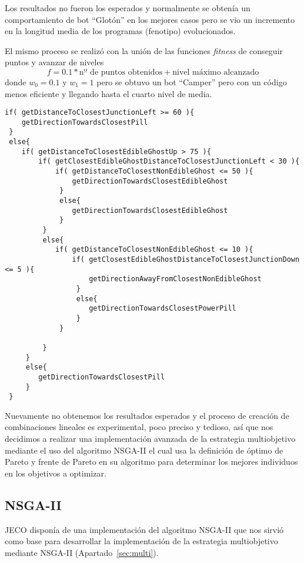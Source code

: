 Los resultados no fueron los esperados y normalmente se obtenía un comportamiento de bot ``Glotón'' en los mejores casos pero se vio un incremento en la longitud media de los programas (fenotipo) evolucionados.

El mismo proceso se realizó con la unión de las funciones \textit{fitness} de conseguir puntos y avanzar de niveles
\begin{equation}
f = 0.1 * \textrm{nº de puntos obtenidos} + \textrm{nivel máximo alcanzado}
\end{equation}
donde $w_0 = 0.1$ y $w_1 = 1$ pero se obtuvo un bot ``Camper'' pero con un código menos eficiente y llegando hasta el cuarto nivel de media.

\begin{lstlisting}[frame=single, breaklines=no, basicstyle=\fontsize{10}{11}\ttfamily, caption=Código del bot Camper obtenido mediante funciones agregativas.]
if( getDistanceToClosestJunctionLeft >= 60 ){ 
    getDirectionTowardsClosestPill
 }
 else{ 
    if( getDistanceToClosestEdibleGhostUp > 75 ){ 
        if( getClosestEdibleGhostDistanceToClosestJunctionLeft < 30 ){ 
            if( getDistanceToClosestNonEdibleGhost <= 50 ){ 
                getDirectionTowardsClosestEdibleGhost
             }
             else{ 
                getDirectionTowardsClosestEdibleGhost
             }
         }
         else{ 
            if( getDistanceToClosestNonEdibleGhost <= 10 ){ 
                if( getClosestEdibleGhostDistanceToClosestJunctionDown <= 5 ){ 
                    getDirectionAwayFromClosestNonEdibleGhost
                 }
                 else{ 
                    getDirectionTowardsClosestPowerPill
                 }
             }
 
         }
     }
     else{ 
        getDirectionTowardsClosestPill
     }
 }
\end{lstlisting}

Nuevamente no obtenemos los resultados esperados y el proceso de creación de combinaciones lineales es experimental, poco preciso y tedioso, así que nos decidimos a realizar una implementación avanzada de la estrategia multiobjetivo mediante el uso del algoritmo NSGA-II el cual usa la definición de óptimo de Pareto y frente de Pareto en su algoritmo para determinar los mejores individuos en los objetivos a optimizar.

\subsection{NSGA-II}
JECO disponía de una implementación del algoritmo NSGA-II que nos sirvió como base para desarrollar la implementación de la estrategia multiobjetivo mediante NSGA-II (Apartado~\ref{sec:multi}).
 
